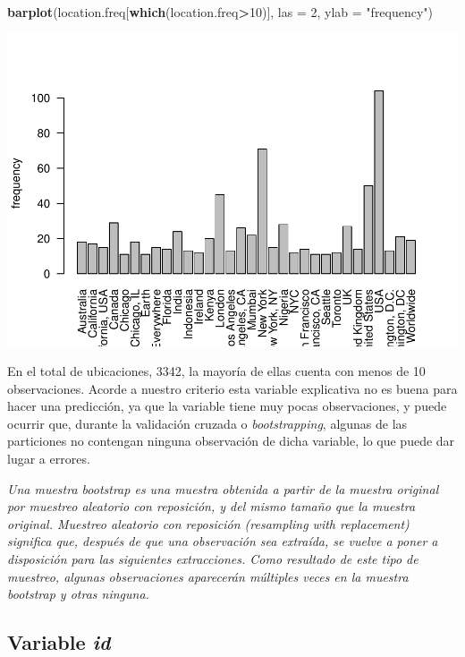 \documentclass[]{article}
\newenvironment{Shaded}{\begin{snugshade}}{\end{snugshade}}
\newcommand{\DataTypeTok}[1]{\textcolor[rgb]{0.13,0.29,0.53}{#1}}
\newcommand{\DecValTok}[1]{\textcolor[rgb]{0.00,0.00,0.81}{#1}}
\newcommand{\KeywordTok}[1]{\textcolor[rgb]{0.13,0.29,0.53}{\textbf{#1}}}
\newcommand{\NormalTok}[1]{#1}
\newcommand{\OperatorTok}[1]{\textcolor[rgb]{0.81,0.36,0.00}{\textbf{#1}}}
\newcommand{\StringTok}[1]{\textcolor[rgb]{0.31,0.60,0.02}{#1}}
\begin{document}
\begin{Shaded}
\begin{Highlighting}[]
\KeywordTok{barplot}\NormalTok{(location.freq[}\KeywordTok{which}\NormalTok{(location.freq}\OperatorTok{>}\DecValTok{10}\NormalTok{)], }\DataTypeTok{las =} \DecValTok{2}\NormalTok{,  }
        \DataTypeTok{ylab =} \StringTok{"frequency"}\NormalTok{)}
\end{Highlighting}
\end{Shaded}

\begin{center}\includegraphics[width=0.7\linewidth]{document_files/figure-latex/unnamed-chunk-9-1} \end{center}

En el total de ubicaciones, 3342, la mayoría de ellas cuenta con menos
de 10 observaciones. Acorde a nuestro criterio esta variable explicativa
no es buena para hacer una predicción, ya que la variable tiene muy
pocas observaciones, y puede ocurrir que, durante la validación cruzada
o \emph{bootstrapping}, algunas de las particiones no contengan ninguna
observación de dicha variable, lo que puede dar lugar a errores.

\emph{Una muestra bootstrap es una muestra obtenida a partir de la
muestra original por muestreo aleatorio con reposición, y del mismo
tamaño que la muestra original. Muestreo aleatorio con reposición
(resampling with replacement) significa que, después de que una
observación sea extraída, se vuelve a poner a disposición para las
siguientes extracciones. Como resultado de este tipo de muestreo,
algunas observaciones aparecerán múltiples veces en la muestra bootstrap
y otras ninguna.}

\hypertarget{variable-id}{%
\subsection{\texorpdfstring{Variable
\emph{id}}{Variable id}}\label{variable-id}}
\end{document}
